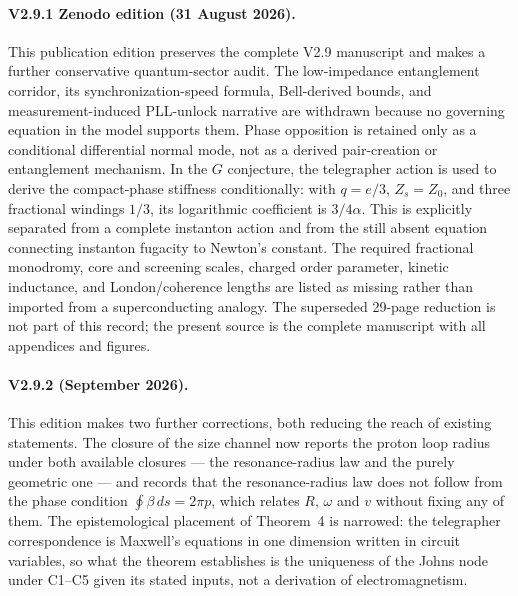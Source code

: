 \documentclass[11pt,a4paper]{article}
\theoremstyle{plain}
\theoremstyle{remark}
\begin{document}
\paragraph{V2.9.1 Zenodo edition (31 August 2026).} This publication edition preserves the complete V2.9 manuscript and makes a further conservative quantum-sector audit. The low-impedance entanglement corridor, its synchronization-speed formula, Bell-derived bounds, and measurement-induced PLL-unlock narrative are withdrawn because no governing equation in the model supports them. Phase opposition is retained only as a conditional differential normal mode, not as a derived pair-creation or entanglement mechanism. In the $G$ conjecture, the telegrapher action is used to derive the compact-phase stiffness conditionally: with $q=e/3$, $Z_s=Z_0$, and three fractional windings $1/3$, its logarithmic coefficient is $3/4\alpha$. This is explicitly separated from a complete instanton action and from the still absent equation connecting instanton fugacity to Newton's constant. The required fractional monodromy, core and screening scales, charged order parameter, kinetic inductance, and London/coherence lengths are listed as missing rather than imported from a superconducting analogy. The superseded 29-page reduction is not part of this record; the present source is the complete manuscript with all appendices and figures.

\paragraph{V2.9.2 (September 2026).} This edition makes two further corrections, both reducing the reach of existing statements. The closure of the size channel now reports the proton loop radius under both available closures --- the resonance-radius law and the purely geometric one --- and records that the resonance-radius law does not follow from the phase condition \mbox{$\oint\beta\,ds = 2\pi p$}, which relates $R$, $\omega$ and $v$ without fixing any of them. The epistemological placement of Theorem~4 is narrowed: the telegrapher correspondence is Maxwell's equations in one dimension written in circuit variables, so what the theorem establishes is the uniqueness of the Johns node under C1--C5 given its stated inputs, not a derivation of electromagnetism.
\end{document}
